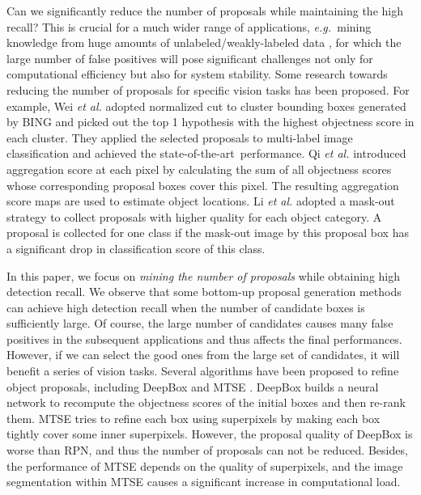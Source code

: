 \documentclass[10pt,twocolumn,letterpaper]{article}
\def\eg{\emph{e.g.~}}
\def\etal{{\em et al.}}
\def\sArt{{state-of-the-art~}}
\begin{document}
Can we significantly reduce the number of proposals while maintaining
the high recall?
This is crucial for a much wider range of applications,
\eg mining knowledge from huge amounts of unlabeled/weakly-labeled
data \cite{wei2016hcp,wu2015deep},
for which the large number of false positives will pose significant challenges
not only for computational efficiency but also for system stability.
%
Some research towards reducing the number of proposals for specific 
vision tasks has been proposed.
%
For example, Wei \etal \cite{wei2016hcp} adopted normalized cut
\cite{shi2000normalized} to cluster bounding boxes generated by BING 
\cite{cheng2014bing} and picked out the top 1 hypothesis with the highest
objectness score in each cluster.
They applied the selected proposals to multi-label image classification
and achieved the \sArt performance.
%
Qi \etal \cite{qi2016augmented} introduced aggregation score at each pixel
by calculating the sum of all objectness scores whose corresponding
proposal boxes cover this pixel.
The resulting aggregation score maps are used to estimate object locations.
%
Li \etal \cite{li2016weakly} adopted a mask-out strategy to collect proposals
with higher quality for each object category.
A proposal is collected for one class if the mask-out image by this proposal 
box has a significant drop in classification score of this class.




In this paper, we focus on \emph{mining the number of proposals}
while obtaining high detection recall.
%
We observe that some bottom-up proposal generation methods can achieve high 
detection recall when the number of candidate boxes is sufficiently large.
Of course, the large number of candidates causes many false positives in
the subsequent applications and thus affects the final performances.
%
However, if we can select the good ones from the large set of candidates,
it will benefit a series of vision tasks.
%
Several algorithms have been proposed to refine object proposals,
including DeepBox \cite{kuo2015deepbox} and MTSE \cite{chen2015improving}.
DeepBox builds a neural network to recompute the objectness scores of the
initial boxes and then re-rank them.
MTSE tries to refine each box using superpixels by making each box tightly
cover some inner superpixels.
However, the proposal quality of DeepBox is worse than RPN, and thus
the number of proposals can not be reduced.
Besides, the performance of MTSE depends on the quality of superpixels,
and the image segmentation within MTSE causes a significant increase in
computational load.
\end{document}
